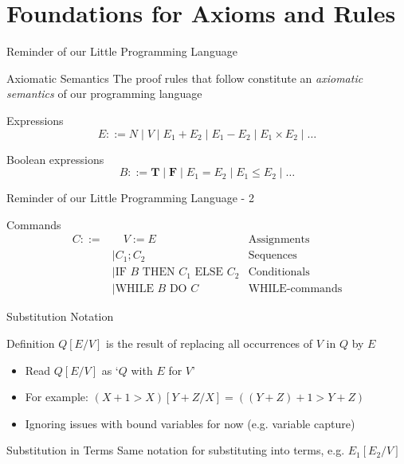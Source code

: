\section{Foundations for Axioms and Rules}

\begin{frame}{Reminder of our Little Programming Language}
    \begin{block}{Axiomatic Semantics}
        The proof rules that follow constitute an \emph{axiomatic semantics} of our programming language
    \end{block}

    \begin{block}{Expressions}
        \[ E ::= N \mid V \mid E_1 + E_2 \mid E_1 - E_2 \mid E_1 \times E_2 \mid \ldots \]
    \end{block}

    \begin{block}{Boolean expressions}
        \[ B ::= \mathbf{T} \mid \mathbf{F} \mid E_1 = E_2 \mid E_1 \leq E_2 \mid \ldots \]
    \end{block}


\end{frame}

\begin{frame}{Reminder of our Little Programming Language - 2}
    \begin{block}{Commands}
        \begin{align*}
            C ::= & \quad V := E & \text{Assignments} \\
            & \mid C_1 ; C_2 & \text{Sequences} \\
            & \mid \text{IF } B \text{ THEN } C_1 \text{ ELSE } C_2 & \text{Conditionals} \\
            & \mid \text{WHILE } B \text{ DO } C & \text{WHILE-commands}
        \end{align*}
    \end{block}
\end{frame}

\begin{frame}{Substitution Notation}
    \begin{block}{Definition}
        $Q[E/V]$ is the result of replacing all occurrences of $V$ in $Q$ by $E$
        \begin{itemize}
            \item Read $Q[E/V]$ as `$Q$ with $E$ for $V$'
            \item For example: $(X+1 > X)[Y+Z/X] = ((Y+Z)+1 > Y+Z)$
            \item Ignoring issues with bound variables for now (e.g. variable capture)
        \end{itemize}
    \end{block}

    \begin{block}{Substitution in Terms}
        Same notation for substituting into terms, e.g. $E_1[E_2/V]$
    \end{block}
\end{frame}

